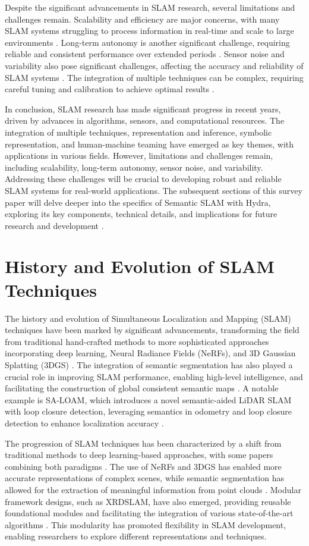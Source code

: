 \documentclass[conference]{IEEEtran}
\begin{document}
Despite the significant advancements in SLAM research, several limitations and challenges remain. Scalability and efficiency are major concerns, with many SLAM systems struggling to process information in real-time and scale to large environments \cite{b10}. Long-term autonomy is another significant challenge, requiring reliable and consistent performance over extended periods \cite{b11}. Sensor noise and variability also pose significant challenges, affecting the accuracy and reliability of SLAM systems \cite{b12}. The integration of multiple techniques can be complex, requiring careful tuning and calibration to achieve optimal results \cite{b13}.

In conclusion, SLAM research has made significant progress in recent years, driven by advances in algorithms, sensors, and computational resources. The integration of multiple techniques, representation and inference, symbolic representation, and human-machine teaming have emerged as key themes, with applications in various fields. However, limitations and challenges remain, including scalability, long-term autonomy, sensor noise, and variability. Addressing these challenges will be crucial to developing robust and reliable SLAM systems for real-world applications. The subsequent sections of this survey paper will delve deeper into the specifics of Semantic SLAM with Hydra, exploring its key components, technical details, and implications for future research and development \cite{b14}.

\section{History and Evolution of SLAM Techniques}
The history and evolution of Simultaneous Localization and Mapping (SLAM) techniques have been marked by significant advancements, transforming the field from traditional hand-crafted methods to more sophisticated approaches incorporating deep learning, Neural Radiance Fields (NeRFs), and 3D Gaussian Splatting (3DGS) \cite{b1}. The integration of semantic segmentation has also played a crucial role in improving SLAM performance, enabling high-level intelligence, and facilitating the construction of global consistent semantic maps \cite{b2}. A notable example is SA-LOAM, which introduces a novel semantic-aided LiDAR SLAM with loop closure detection, leveraging semantics in odometry and loop closure detection to enhance localization accuracy \cite{b3}.

The progression of SLAM techniques has been characterized by a shift from traditional methods to deep learning-based approaches, with some papers combining both paradigms \cite{b4}. The use of NeRFs and 3DGS has enabled more accurate representations of complex scenes, while semantic segmentation has allowed for the extraction of meaningful information from point clouds \cite{b5}. Modular framework designs, such as XRDSLAM, have also emerged, providing reusable foundational modules and facilitating the integration of various state-of-the-art algorithms \cite{b6}. This modularity has promoted flexibility in SLAM development, enabling researchers to explore different representations and techniques.
\end{document}
